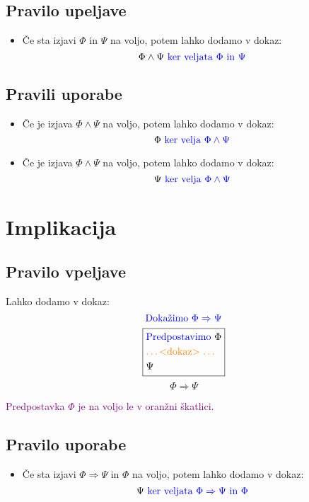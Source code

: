 \documentclass[12pt,a4paper]{article}
\newcommand{\blue}[1]{\textcolor{blue}{#1}}
\newcommand{\orange}[1]{\textcolor{orange}{#1}}
\newcommand{\purple}[1]{\textcolor{purple}{#1}}
\begin{document}
    \subsection*{Pravilo upeljave}
        \begin{itemize}
            \item Če sta izjavi $ \Phi $ in $ \Psi $ na voljo, potem lahko dodamo v dokaz:
            $$  \Phi \wedge \Psi \blue{\text{ ker veljata }  \Phi  \text{ in } \Psi}  $$
        \end{itemize}

    \subsection*{Pravili uporabe}
    \begin{itemize}
        \item Če je izjava $ \Phi \wedge \Psi $ na voljo, potem lahko dodamo v dokaz:
        $$ \Phi \blue{\text{ ker velja } \Phi \wedge \Psi } $$
        \item Če je izjava $ \Phi \wedge \Psi $ na voljo, potem lahko dodamo v dokaz:
        $$ \Psi \blue{\text{ ker velja } \Phi \wedge \Psi } $$
    \end{itemize}

\section{Implikacija}
    \subsection*{Pravilo vpeljave}
    Lahko dodamo v dokaz:
    $$ \blue{\text{Dokažimo } \Phi \Rightarrow \Psi}  $$
    \begin{equation*}
        \boxed{
        \begin{aligned}
            &\blue{\text{Predpostavimo }} \Phi  \\ 
            &\orange{\text{\ldots <dokaz> \ldots}} \\ 
            &\Psi
        \end{aligned}
        }
    \end{equation*}
    $$ \Phi \Rightarrow \Psi $$

    \noindent \purple{Predpostavka $ \Phi $ je na voljo le v oranžni škatlici.}

    \subsection*{Pravilo uporabe}
    \begin{itemize}
        \item Če sta izjavi $ \Phi \Rightarrow \Psi $ in $ \Phi $ na voljo, potem lahko dodamo v dokaz:
        $$  \Psi \blue{\text{ ker veljata } \Phi \Rightarrow \Psi \text{ in } \Phi}   $$
    \end{itemize}
\end{document}
